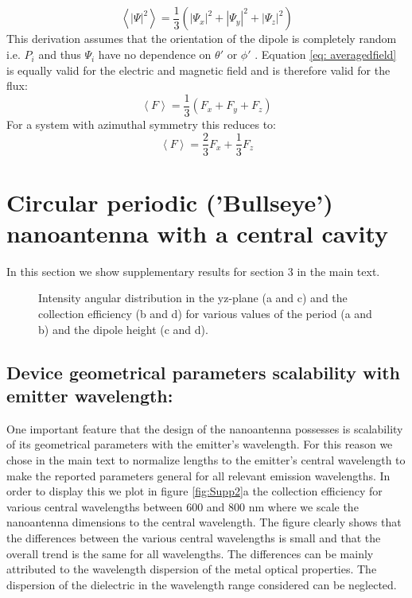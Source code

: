 \documentclass[main.tex]{subfile}
\begin{document}
\begin{equation}
\label{eq: averagedfield}
\left<|\Psi|^2\right> = \frac{1}{3}\left( |\Psi_x|^2+|\Psi_y|^2+|\Psi_z|^2 \right)
\end{equation}
This derivation assumes that the orientation of the dipole is completely random i.e. $P_i$ and thus $\Psi_i$ have no dependence on $\theta'$ or $\phi'$ .  Equation \ref{eq: averagedfield} is equally valid for the electric and magnetic field and is therefore valid for the flux: 
\begin{equation}
\label{eq: averagedflux}
\left<F\right> = \frac{1}{3}\left( F_x+F_y+F_z \right)
\end{equation}
For a  system with azimuthal symmetry this reduces to:
\begin{equation}
\label{eq: averagedfluxazimuthal}
\left<F\right> = \frac{2}{3} F_x+\frac{1}{3}F_z 
\end{equation}\section{Circular periodic ('Bullseye') nanoantenna with a central cavity}
In this section we show supplementary results for section 3 in the main text. 

\begin{figure}[t!]
\caption{Intensity angular distribution in the yz-plane (a and c) and the collection efficiency (b and d) for various values of the period (a and b) and the dipole height (c and d).  }
\label{fig:Supp3}
\end{figure}

\subsection*{Device geometrical parameters scalability with emitter wavelength:}
One important feature that the design of the nanoantenna possesses is scalability of its geometrical parameters with the emitter's wavelength. 
For this reason we chose in the main text to normalize lengths to the emitter's central wavelength to make the reported parameters general for all relevant emission wavelengths.
In order to display this we plot in figure \ref{fig:Supp2}a the collection efficiency for various central wavelengths between $600$ and $800$ nm where we scale the nanoantenna dimensions to the central wavelength. 
The figure clearly shows that the differences between the various central wavelengths is small and that the overall trend is the same for all wavelengths. 
The differences can be mainly attributed to the wavelength dispersion of the metal optical properties. 
The dispersion of the dielectric in the wavelength range considered can be neglected. 
\end{document}
